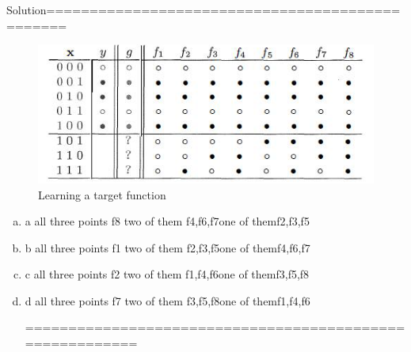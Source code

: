\documentclass[11pt, a4paper]{article}
\begin{document}
Solution================================================
\begin{figure}[h]
	\centering
	\includegraphics[width=0.4\linewidth]{1_8.png}
	\caption{Learning a target function}
	\label{fig:2}
\end{figure}
\begin{enumerate}[(a)]
	\item 
	a \quad all three points  \quad f8 \quad  two of them \quad f4,f6,f7\quad  one of them\quad f2,f3,f5 \quad
	
	\item b \quad all three points  \quad f1 \quad  two of them \quad f2,f3,f5\quad  one of them\quad f4,f6,f7 \quad

	\item c \quad all three points  \quad f2 \quad  two of them \quad f1,f4,f6\quad  one of them\quad f3,f5,f8 \quad
		
	\item d \quad all three points  \quad f7 \quad  two of them \quad f3,f5,f8\quad  one of them\quad f1,f4,f6 \quad
	
	=========================================================
	\end{enumerate}
\end{document}

